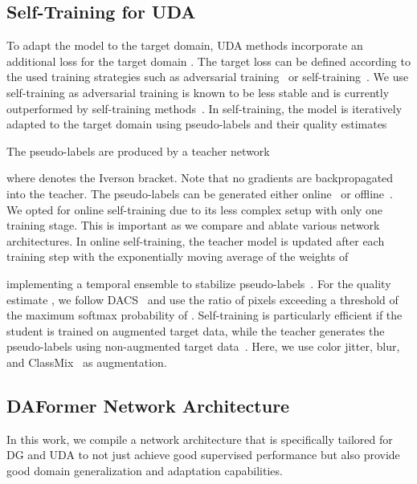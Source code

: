 \documentclass[journal,compsoc]{IEEEtran}
\begin{document}
\subsection{Self-Training for UDA}
\label{sec:methods_self_training}

To adapt the model to the target domain, UDA methods incorporate an additional loss for the target domain .
The target loss can be defined according to the used training strategies such as adversarial training~\cite{tsai2018learning,wang2020classes} or self-training~\cite{zou2018unsupervised,tranheden2021dacs,zhang2021prototypical}. 
We use self-training as adversarial training is known to be less stable and is currently outperformed by self-training methods~\cite{tranheden2021dacs, zhang2021prototypical}.
In self-training, the model  is iteratively adapted to the target domain using pseudo-labels  and their quality estimates 

The pseudo-labels are produced by a teacher network 

where  denotes the Iverson bracket.
Note that no gradients are backpropagated into the teacher.
The pseudo-labels can be generated either online~\cite{araslanov2021self,tranheden2021dacs} or offline~\cite{zou2018unsupervised, zou2019confidence}.
We opted for online self-training due to its less complex setup with only one training stage. This is important as we compare and ablate various network architectures.
In online self-training, the teacher model  is updated after each training step  with the exponentially moving average of the weights of 

implementing a temporal ensemble to stabilize pseudo-labels~\cite{tarvainen2017mean}.
For the quality estimate , we follow DACS~\cite{tranheden2021dacs} and use the ratio of pixels exceeding a threshold  of the maximum softmax probability of .
Self-training is particularly efficient if the student  is trained on augmented target data, while the teacher  generates the pseudo-labels using non-augmented target data~\cite{tarvainen2017mean, tranheden2021dacs, araslanov2021self}.
Here, we use color jitter, blur, and ClassMix~\cite{olsson2020classmix} as augmentation.


\subsection{DAFormer Network Architecture}
\label{sec:methods_architecture}

In this work, we compile a network architecture that is specifically tailored for DG and UDA to not just achieve good supervised performance but also provide good domain generalization and adaptation capabilities.
\end{document}

